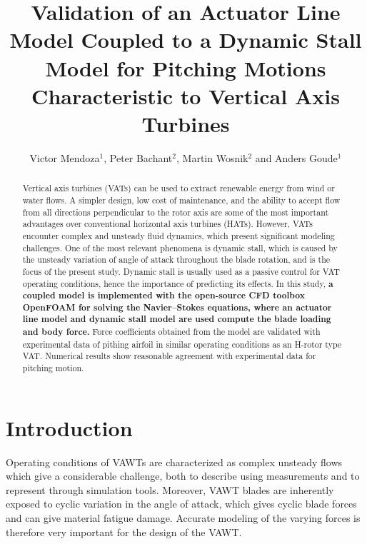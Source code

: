 \documentclass[a4paper]{jpconf}
\begin{document}
\title{Validation of an Actuator Line Model Coupled to a Dynamic Stall Model for
Pitching Motions Characteristic to Vertical Axis Turbines}


\author{Victor Mendoza$^{1}$, Peter Bachant$^{2}$, Martin Wosnik$^{2}$ and Anders Goude$^{1}$ }
\address{$^{1}$ Department of Engineering Sciences, Division of Electricity, Uppsala University, \\Uppsala 751 21, Sweden}
\address{$^{2}$ Center for Ocean Renewable Energy, University of New Hampshire, 24 Colovos Rd.,\\ Durham, NH 03824, USA}


\begin{abstract}

    Vertical axis turbines (VATs) can be used to extract renewable energy from
    wind or water flows. A simpler design, low cost of maintenance, and the
    ability to accept flow from all directions perpendicular to the rotor axis
    are some of the most important advantages over conventional horizontal axis
    turbines (HATs). However, VATs encounter complex and unsteady fluid
    dynamics, which present significant modeling challenges. One of the most
    relevant phenomena is dynamic stall, which is caused by the unsteady
    variation of angle of attack throughout the blade rotation, and is the focus
    of the present study. Dynamic stall is usually used as a passive control for
    VAT operating conditions, hence the importance of predicting its effects. In
    this study, \textbf{a coupled model is implemented with the open-source CFD
    toolbox OpenFOAM for solving the Navier--Stokes equations, where an actuator
    line model and dynamic stall model are used compute the blade loading and
    body force.} Force coefficients obtained from the model are validated with
    experimental data of pithing airfoil in similar operating conditions as an
    H-rotor type VAT. Numerical results show reasonable agreement with
    experimental data for pitching motion.

\end{abstract}


\section{Introduction}

Operating conditions of VAWTs are characterized as complex unsteady flows which
give a considerable challenge, both to describe using measurements and to
represent through simulation tools\cite{huyer1996unsteady}. Moreover, VAWT
blades are inherently exposed to cyclic variation in the angle of attack, which
gives cyclic blade forces and can give material fatigue damage. Accurate
modeling of the varying forces is therefore very important for the design of the
VAWT.
\end{document}
